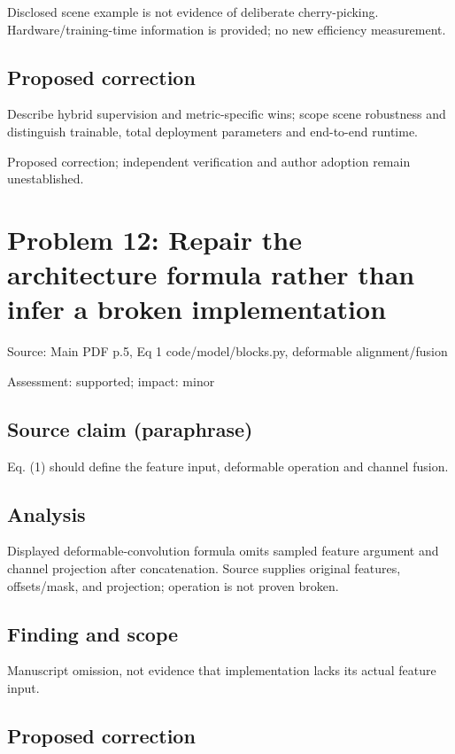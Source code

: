 \documentclass[11pt]{article}
\begin{document}
Disclosed scene example is not evidence of deliberate cherry-picking. Hardware/training-time information is provided; no new efficiency measurement.

\subsection*{Proposed correction}

Describe hybrid supervision and metric-specific wins; scope scene robustness and distinguish trainable, total deployment parameters and end-to-end runtime.

Proposed correction; independent verification and author adoption remain unestablished.

\section*{Problem 12: Repair the architecture formula rather than infer a broken implementation}

Source: Main PDF p.5, Eq 1 code/model/blocks.py, deformable alignment/fusion

Assessment: supported; impact: minor

\subsection*{Source claim (paraphrase)}

Eq. (1) should define the feature input, deformable operation and channel fusion.

\subsection*{Analysis}

Displayed deformable-convolution formula omits sampled feature argument and channel projection after concatenation. Source supplies original features, offsets/mask, and projection; operation is not proven broken.

\subsection*{Finding and scope}

Manuscript omission, not evidence that implementation lacks its actual feature input.

\subsection*{Proposed correction}
\end{document}
